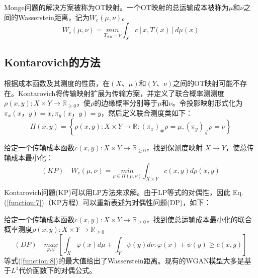 \begin{definition}[OT映射]	\label{definition:3.2}
	Monge问题的解决方案被称为OT映射。一个OT映射的总运输成本被称为$\mu$和$\nu$之间的Wasserstein距离，记为$W_c(\mu,\nu)$。
	\begin{equation}
		W_c(\mu,\nu)= \underset{T_{\# \mu}=\nu}{min} \int_X c[x,T(x)]d\mu(x)  
		\label{function:5}
	\end{equation}
\end{definition}

\subsection{Kontarovich的方法}

根据成本函数及其测度的性质，在$(X、\mu)$和$(Y、\nu)$之间的OT映射可能不存在。Kontarovich将传输映射扩展为传输方案，并定义了联合概率测测度$\rho(x,y): X \times Y \to \mathbb{R}_{\ge 0}$，使$\rho$的边缘概率分别等于$\mu$和$\nu$。令投影映射形式化为$\pi_x(x，y)=x, \pi_y(x，y)=y$，然后定义联合测度类如下：
\begin{equation}
	\Pi(x,y)= \left\{ \rho(x,y): X\times Y \to \mathbb{R} : (\pi_x)_{\#}\rho=\mu, (\pi_y)_{\#}\rho=\nu \right\} 
	\label{function:6}
\end{equation}

\begin{problem}[Kontarovich;KP]	\label{problem:3.2}
	给定一个传输成本函数$c(x,y): X \times Y\to\mathbb{R}_{\ge 0}$，找到保测度映射 $X \to Y$，使总传输成本最小化：
	\begin{equation}
		(KP) \quad W_c (\mu,\nu)= \underset{\rho \in \Pi(\mu,\nu)}{min} \int_{X \times Y} c(x,y)d\rho(x,y)  
		\label{function:7}
	\end{equation}
\end{problem}

Kontarovich问题(KP)可以用LP方法来求解。由于LP等式的对偶性，因此 Eq.(\ref{function:7})（KP方程）可以重新表述为对偶性问题(DP)，如下：
\begin{problem}[对偶;DP]	\label{problem:3.3}
	给定一个传输成本函数$c(x,y):X\times Y \to \mathbb{R}_{\ge0}$，找到使总运输成本最小化的联合概率测度$\rho(x,y): X \times Y \to \mathbb{R}_{\ge0}$
	\begin{equation}
		(DP) \quad \underset{\varphi , \psi }{max}\left [ \int_X \varphi (x)d\mu + \int_Y \psi (y)d\nu : \varphi(x)+\psi(y) \ge c(x,y) \right ]   
		\label{function:8}
	\end{equation}
	等式(\ref{function:8})的最大值给出了Wasserstein距离。现有的WGAN模型大多是基于$L^1$代价函数下的对偶公式。
\end{problem}


